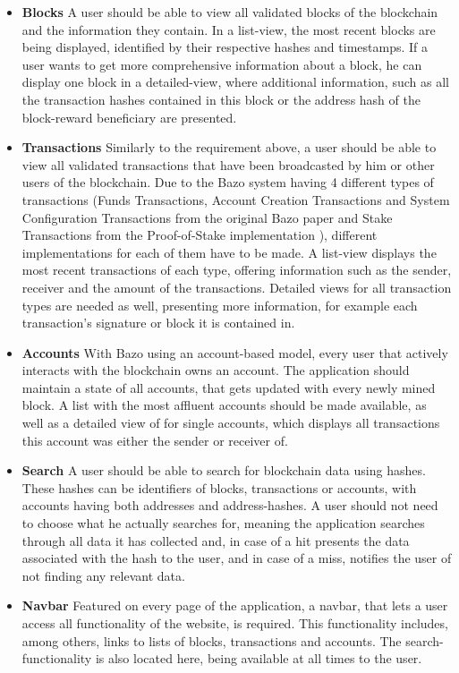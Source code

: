 \begin{itemize}
\item \textbf{Blocks}
A user should be able to view all validated blocks of the blockchain and the information they contain. In a list-view, the most recent blocks are being displayed, identified by their respective hashes and timestamps. If a user wants to get more comprehensive information about a block, he can display one block in a detailed-view, where additional information, such as all the transaction hashes contained in this block or the address hash of the block-reward beneficiary are presented.
\item \textbf{Transactions}
Similarly to the requirement above, a user should be able to view all validated transactions that have been broadcasted by him or other users of the blockchain. Due to the Bazo system having 4 different types of transactions (Funds Transactions, Account Creation Transactions and System Configuration Transactions from the original Bazo paper \cite{bazo} and Stake Transactions from the Proof-of-Stake implementation \cite{pos}), different implementations for each of them have to be made. A list-view displays the most recent transactions of each type, offering information such as the sender, receiver and the amount of the transactions. Detailed views for all transaction types are needed as well, presenting more information, for example each transaction's signature or block it is contained in.
\item \textbf{Accounts}
With Bazo using an account-based model, every user that actively interacts with the blockchain owns an account. The application should maintain a state of all accounts, that gets updated with every newly mined block. A list with the most affluent accounts should be made available, as well as a detailed view of for single accounts, which displays all transactions this account was either the sender or receiver of.
\item \textbf{Search}
A user should be able to search for blockchain data using hashes. These hashes can be identifiers of blocks, transactions or accounts, with accounts having both addresses and address-hashes. A user should not need to choose what he actually searches for, meaning the application searches through all data it has collected and, in case of a hit presents the data associated with the hash to the user, and in case of a miss, notifies the user of not finding any relevant data.
\item \textbf{Navbar}
Featured on every page of the application, a navbar, that lets a user access all functionality of the website, is required. This functionality includes, among others, links to lists of blocks, transactions and accounts. The search-functionality is also located here, being available at all times to the user.

\end{itemize}
